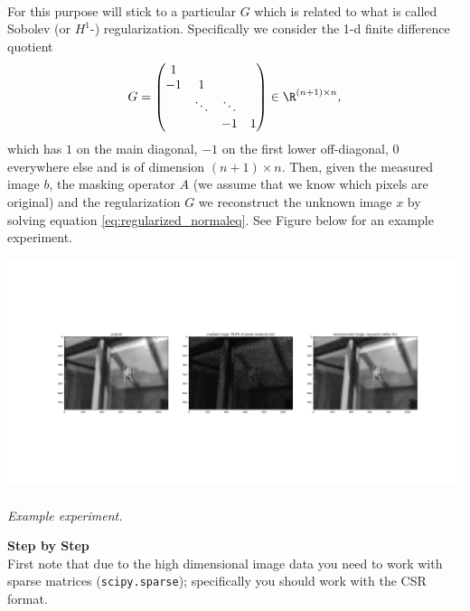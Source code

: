 {	~\\
	For this purpose will stick to a particular $G$ which is related to what is called Sobolev (or $H^1$-) regularization. Specifically we consider the 1-d finite difference quotient
	\begin{equation}\label{eq:G}
	 G = \begin{pmatrix}
	  1 & &  &  \\
	  -1 & 1 &   &\\
	   &\ddots&\ddots & \\
	   & &-1 & 1\\
	 \end{pmatrix} \in \R^{(n+1)\times n},
	\end{equation}
	which has $1$ on the main diagonal, $-1$ on the first lower off-diagonal, $0$ everywhere else and is of dimension $(n+1)\times n$. Then, given the measured image $b$, the masking operator $A$ (we assume that we know which pixels are original) and the regularization $G$ we reconstruct the unknown image $x$ by solving equation \eqref{eq:regularized_normaleq}. See Figure below for an example experiment.
}
\begin{center}
	\includegraphics[trim={7cm 10.2cm 7cm 10.2cm},clip, width=1.\textwidth]{Image_Inpainting}\\~\\
	\textit{Example experiment.}
\end{center}
\newpage
\textbf{Step by Step}\\
First note that due to the high dimensional image data you need to work with sparse matrices (\texttt{scipy.sparse}); specifically you should work with the CSR format.
